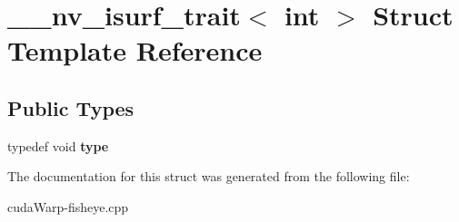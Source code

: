 \hypertarget{struct____nv__isurf__trait_3_01int_01_4}{}\section{\+\_\+\+\_\+nv\+\_\+isurf\+\_\+trait$<$ int $>$ Struct Template Reference}
\label{struct____nv__isurf__trait_3_01int_01_4}
\subsection*{Public Types}
\begin{DoxyCompactItemize}
\item 
typedef void {\bfseries type}\hypertarget{struct____nv__isurf__trait_3_01int_01_4_a24a9f4bfd52918ba92fc55ffcbaf10b7}{}\label{struct____nv__isurf__trait_3_01int_01_4_a24a9f4bfd52918ba92fc55ffcbaf10b7}

\end{DoxyCompactItemize}


The documentation for this struct was generated from the following file\+:\begin{DoxyCompactItemize}
\item 
cuda\+Warp-\/fisheye.\+cpp\end{DoxyCompactItemize}

